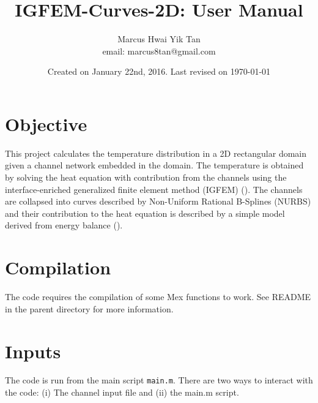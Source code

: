 \documentclass[11pt,letterpaper]{article}
\title{IGFEM-Curves-2D: User Manual}
\author{Marcus Hwai Yik Tan \\ email: marcus8tan@gmail.com}
\date{Created on January 22nd, 2016. Last revised on \today}
\renewcommand\cite[1]{(\citet{#1})}
\begin{document}
\maketitle

\section{Objective}
This project calculates the temperature distribution in a 2D rectangular domain given a channel network embedded in the domain. The temperature is obtained by solving the heat equation with contribution from the channels using the interface-enriched generalized finite element method (IGFEM) \cite{Soghrati12_2D}.  The channels are collapsed into curves described by Non-Uniform Rational B-Splines (NURBS) and their contribution to the heat equation is described by a simple model derived from energy balance \cite{Tan15,Tan16}. 

\section{Compilation}
The code requires the compilation of some Mex functions to work. See README in the parent directory for more information. 

\section{Inputs}
The code is run from the main script \texttt{main.m}. There are two ways to interact with the code: (i) The channel input file and (ii) the main.m script.
\end{document}
